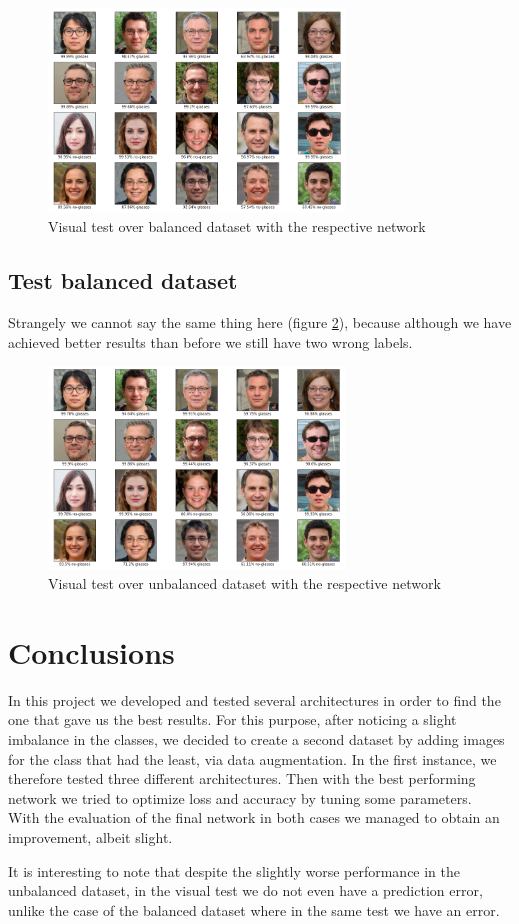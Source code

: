 \documentclass{article}
\begin{document}
\begin{figure}[H]
    \centering
    \includegraphics[width=0.7\textwidth]{images/test_unb.png}
    \caption{Visual test over balanced dataset with the respective network}
    \label{fig:test_unb}
\end{figure}

\subsection{Test balanced dataset}
Strangely we cannot say the same thing here (figure \ref{fig:test_bal}), because although we have achieved better results than before we still have two wrong labels.

\begin{figure}[H]
    \centering
    \includegraphics[width=0.7\textwidth]{images/test_bal.png}
    \caption{Visual test over unbalanced dataset with the respective network}
    \label{fig:test_bal}
\end{figure}

\section{Conclusions}
In this project we developed and tested several architectures in order to find the one that gave us the best results. For this purpose, after noticing a slight imbalance in the classes, we decided to create a second dataset by adding images for the class that had the least, via data augmentation. In the first instance, we therefore tested three different architectures. Then with the best performing network we tried to optimize loss and accuracy by tuning some parameters.\\
With the evaluation of the final network in both cases we managed to obtain an improvement, albeit slight.

It is interesting to note that despite the slightly worse performance in the unbalanced dataset, in the visual test we do not even have a prediction error, unlike the case of the balanced dataset where in the same test we have an error.
\end{document}
